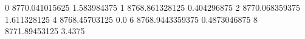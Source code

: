 0 8770.041015625 1.583984375
1 8768.861328125 0.404296875
2 8770.068359375 1.611328125
4 8768.45703125 0.0
6 8768.9443359375 0.4873046875
8 8771.89453125 3.4375
